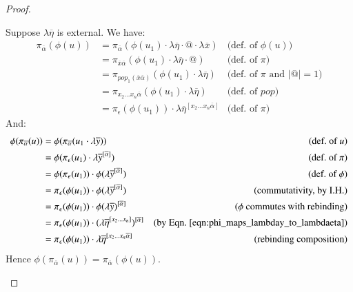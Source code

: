 \documentclass{elsarticle}
\theoremstyle{plain}
\theoremstyle{definition}
\def\coresymbol{\pi} %
\begin{document}
\begin{proof}
\begin{itemize}
    Suppose $\lambda\overline\eta$ is external. We have:
    \begin{align*}
        \coresymbol_{\overline\alpha}(\phi(u))
        &=  \coresymbol_{\overline\alpha}(\phi(u_1) \cdot \lambda\overline{\eta} \cdot @ \cdot \lambda\overline{x})
            & \mbox{(def.~of $\phi(u)$)}
        \\
        &=  \coresymbol_{\overline{x}\overline\alpha}(\phi(u_1) \cdot
        \lambda\overline\eta \cdot @)
            & \mbox{(def.~of $\coresymbol$)}
        \\
        &=  \coresymbol_{pop_1(\overline{x}\overline\alpha)}(\phi(u_1) \cdot \lambda\overline\eta)
            & \mbox{(def.~of $\coresymbol$ and $|@|=1$)}
        \\
        &=  \coresymbol_{x_2\ldots x_n \overline\alpha}(\phi(u_1) \cdot \lambda\overline\eta)
        & \mbox{(def.~of $pop$)}
        \\
        &=  \coresymbol_{\epsilon}(\phi(u_1)) \cdot \lambda\overline\eta^{[x_2\ldots x_n \overline\alpha]}
            & \mbox{(def.~of $\coresymbol$)}
    \end{align*}
    And:
    \begin{align*}
        \phi(\coresymbol_{\overline\alpha}(u))
        &= \phi(\coresymbol_{\overline\alpha}(u_1 \cdot \lambda\overline{y}))
        & \mbox{(def.~of $u$)}
    \\
        &= \phi(\coresymbol_{\epsilon}(u_1) \cdot \lambda\overline{y}^{[\overline\alpha]})
        & \mbox{(def.~of $\coresymbol$)}
    \\
        &= \phi(\coresymbol_{\epsilon}(u_1)) \cdot \phi(\lambda\overline{y}^{[\overline\alpha]})
        & \mbox{(def.~of $\phi$)}
    \\
        &=  \coresymbol_{\epsilon}(\phi(u_1)) \cdot \phi(\lambda\overline{y}^{[\overline\alpha]})
        & \mbox{(commutativity, by I.H.)}
    \\
        &=  \coresymbol_{\epsilon}(\phi(u_1)) \cdot \phi(\lambda\overline{y})^{[\overline\alpha]}
        & \mbox{($\phi$ commutes with rebinding)}
    \\
    &=  \coresymbol_{\epsilon}(\phi(u_1)) \cdot (\lambda\overline\eta^{[x_2\ldots x_n]})^{[\overline\alpha]}
        & \mbox{(by Eqn.~\ref{eqn:phi_maps_lambday_to_lambdaeta})}
    \\
        &=  \coresymbol_{\epsilon}(\phi(u_1)) \cdot\lambda\overline\eta^{[x_2\ldots x_n \overline\alpha]}
        & \mbox{(rebinding composition)}
    \end{align*}
    Hence $\phi(\coresymbol_{\overline\alpha}(u)) = \coresymbol_{\overline\alpha}(\phi(u))$.


\end{itemize}
\end{proof}
\end{document}

